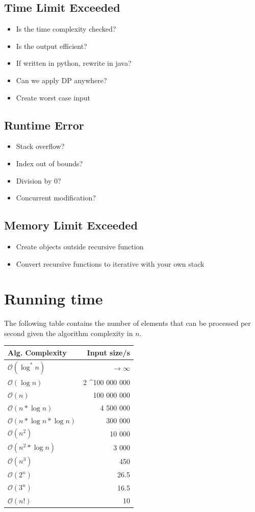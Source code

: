 \documentclass[8pt,a4paper,landscape,oneside]{amsart}
\newcommand{\bigO}{\mathcal{O}}
\begin{document}
\begin{multicols*}{3}
  \subsection{Time Limit Exceeded}
    \begin{itemize}
    \item Is the time complexity checked?
    \item Is the output efficient?
    \item If written in python, rewrite in java?
    \item Can we apply DP anywhere?
    \item Create worst case input
    \end{itemize}
  \subsection{Runtime Error}
    \begin{itemize}
    \item Stack overflow?
    \item Index out of bounds?
    \item Division by $0$?
    \item Concurrent modification?
    \end{itemize}
  \subsection{Memory Limit Exceeded}
    \begin{itemize}
    \item Create objects outside recursive function
    \item Convert recursive functions to iterative with your own stack
    \end{itemize}
        
        
\section{Running time}
The following table contains the number of elements that can be processed per second given the algorithm complexity in $n$.
\begin{center}
\begin{tabular}{lr}
Alg. Complexity & Input size/s \\ \hline
$\bigO(\log^*{n})$   & $\rightarrow \infty$ \\
$\bigO(\log{n})$     & 2 \textasciicircum 100 000 000 \\
$\bigO(n)$           & 100 000 000 \\
$\bigO(n*\log{n})$   & 4 500 000 \\
$\bigO(n*\log{n}*\log{n})$ & 300 000 \\
$\bigO(n^2)$         & 10 000 \\
$\bigO(n^2*\log{n})$ & 3 000 \\
$\bigO(n^3)$         & 450 \\
$\bigO(2^n)$         & 26.5 \\
$\bigO(3^n)$         & 16.5 \\
$\bigO(n!)$          & 10
\end{tabular}
\end{center}


\end{multicols*}
\end{document}

